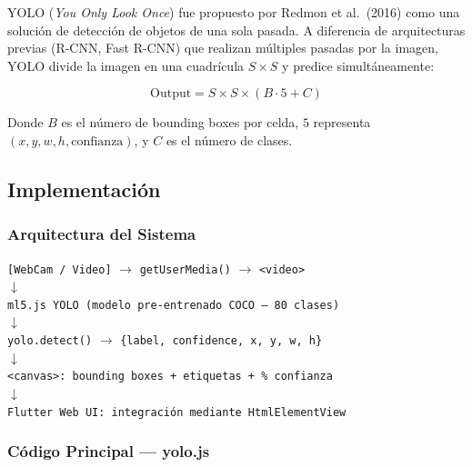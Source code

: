 \documentclass[12pt,a4paper]{article}
\begin{document}
YOLO (\textit{You Only Look Once}) fue propuesto por Redmon et al.\ (2016) como una solución de detección de objetos de una sola pasada. A diferencia de arquitecturas previas (R-CNN, Fast R-CNN) que realizan múltiples pasadas por la imagen, YOLO divide la imagen en una cuadrícula $S \times S$ y predice simultáneamente:

\[
  \text{Output} = S \times S \times (B \cdot 5 + C)
\]

Donde $B$ es el número de bounding boxes por celda, $5$ representa $(x, y, w, h, \text{confianza})$, y $C$ es el número de clases.

\subsection{Implementación}

\subsubsection{Arquitectura del Sistema}

\begin{center}
\begin{tcolorbox}[infobox, width=14cm]
  \texttt{[WebCam / Video]} $\longrightarrow$ \texttt{getUserMedia()} $\longrightarrow$ \texttt{<video>}\\
  $\downarrow$\\
  \texttt{ml5.js YOLO (modelo pre-entrenado COCO — 80 clases)}\\
  $\downarrow$\\
  \texttt{yolo.detect()} $\longrightarrow$ \texttt{\{label, confidence, x, y, w, h\}}\\
  $\downarrow$\\
  \texttt{<canvas>: bounding boxes + etiquetas + \% confianza}\\
  $\downarrow$\\
  \texttt{Flutter Web UI: integración mediante HtmlElementView}
\end{tcolorbox}
\end{center}

\subsubsection{Código Principal — yolo.js}
\end{document}
